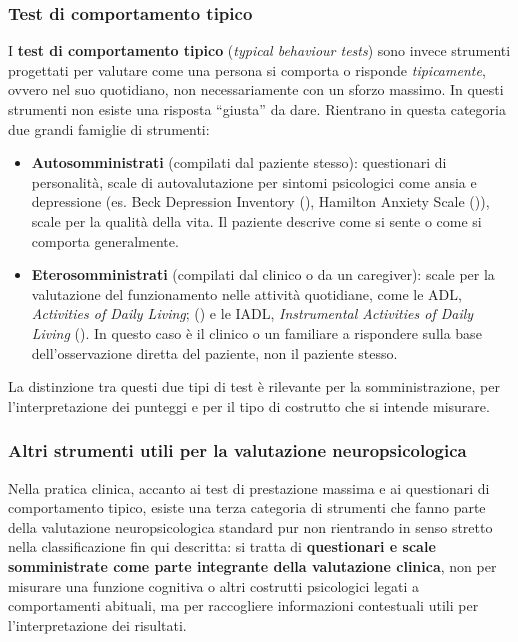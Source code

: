 \documentclass[
  italian,
  letterpaper,
  paper=A4,
  headinclude=on,
  footinclude=on,
  12pt]{scrbook}
\providecommand{\tightlist}{%
  \setlength{\itemsep}{0pt}\setlength{\parskip}{0pt}}
\begin{document}
\subsubsection{Test di comportamento
tipico}\label{test-di-comportamento-tipico}

I \textbf{test di comportamento tipico} (\emph{typical behaviour tests})
sono invece strumenti progettati per valutare come una persona si
comporta o risponde \emph{tipicamente}, ovvero nel suo quotidiano, non
necessariamente con un sforzo massimo. In questi strumenti non esiste
una risposta ``giusta'' da dare. Rientrano in questa categoria due
grandi famiglie di strumenti:

\begin{itemize}
\tightlist
\item
  \textbf{Autosomministrati} (compilati dal paziente stesso):
  questionari di personalità, scale di autovalutazione per sintomi
  psicologici come ansia e depressione (es. Beck Depression Inventory
  (\cite{beck1961inventory}), Hamilton Anxiety Scale
  (\cite{hamilton1959assessment})), scale per la qualità della vita. Il
  paziente descrive come si sente o come si comporta generalmente.
\item
  \textbf{Eterosomministrati} (compilati dal clinico o da un caregiver):
  scale per la valutazione del funzionamento nelle attività quotidiane,
  come le ADL, \emph{Activities of Daily Living};
  (\cite{katz1963studies}) e le IADL, \emph{Instrumental Activities of
  Daily Living} (\cite{lawton1969assessment}). In questo caso è il
  clinico o un familiare a rispondere sulla base dell'osservazione
  diretta del paziente, non il paziente stesso.
\end{itemize}

La distinzione tra questi due tipi di test è rilevante per la
somministrazione, per l'interpretazione dei punteggi e per il tipo di
costrutto che si intende misurare.

\subsubsection{Altri strumenti utili per la valutazione
neuropsicologica}\label{altri-strumenti-utili-per-la-valutazione-neuropsicologica}

Nella pratica clinica, accanto ai test di prestazione massima e ai
questionari di comportamento tipico, esiste una terza categoria di
strumenti che fanno parte della valutazione neuropsicologica standard
pur non rientrando in senso stretto nella classificazione fin qui
descritta: si tratta di \textbf{questionari e scale somministrate come
parte integrante della valutazione clinica}, non per misurare una
funzione cognitiva o altri costrutti psicologici legati a comportamenti
abituali, ma per raccogliere informazioni contestuali utili per
l'interpretazione dei risultati.
\end{document}
